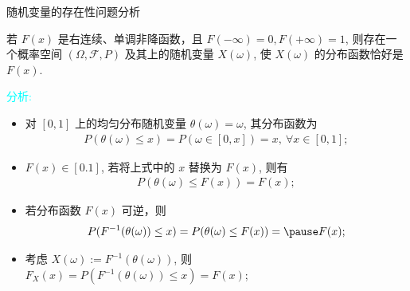 \documentclass[Prob-All.tex]{subfiles}
\begin{document}
 \begin{frame}{随机变量的存在性问题分析}
 \begin{thm}\label{sec:existofrv}
 \hspace{-0.2cm} 若 $F (x)$ 是右连续、单调非降函数，且 $F (-\infty)=0, F (+\infty)=1$, 则存在一个概率空间 $(\Omega,\mathcal{F},P)$ 及其上的随机变量 $X (\omega)$, 使 $X (\omega)$ 的分布函数恰好是 $F (x)$.
 \end{thm}

 \textcolor{cyan}{分析:}
 \begin{itemize}[<+-|alert@+>]
	 \item 对 $[0,1]$ 上的均匀分布随机变量 $\theta (\omega)=\omega$, 其分布函数为 %
	 \begin{eqnarray*}
		 P(\theta(\omega)\le x)=P(\omega\in[0,x])=x, \ \forall x\in[0,1];
	 \end{eqnarray*}
	 \item $F (x)\in[0.1]$, 若将上式中的 $x$ 替换为 $F (x)$, 则有
		 \begin{eqnarray*}
		 P(\theta(\omega)\le F(x))=F(x);
	 \end{eqnarray*}
	 \item 若分布函数 $F (x)$ 可逆，则
	 \begin{eqnarray*}
	 P(F^{-1}(\theta(\omega))\le x)=	P(\theta(\omega)\le F(x))=\pause F(x);
	 \end{eqnarray*}

	 \item 考虑 $X (\omega):=F^{-1}(\theta (\omega))$, 则 $F_X (x)= P (F^{-1}(\theta (\omega))\le x)= F (x)$;


 \end{itemize}


 \end{frame}
\end{document}
